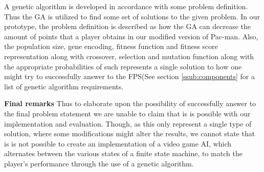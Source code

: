 A genetic algorithm is developed in accordance with some problem definition. Thus the GA is utilized to find some set of solutions to the given problem. In our prototype, the problem definition is described as how the GA can decrease the amount of points that a player obtains in our modified version of Pac-man.  Also, the population size, gene encoding, fitness function and fitness score representation along with crossover, selection and mutation function along with the appropriate probabilities of such represents a single solution to how one might try to successfully answer to the FPS(See section \ref{ssub:components} for a list of genetic algorithm requirements.



\textbf{Final remarks}
Thus to elaborate upon the possibility of successfully answer to the final problem statement we are unable to claim that is is possible with our implementation and evaluation. Though, as this only represent a single type of solution, where some modifications might alter the results, we cannot state that is is not possible to create an implementation of a video game AI, which alternates between the various states of a finite state machine, to match the player's performance through the use of a genetic algorithm.

